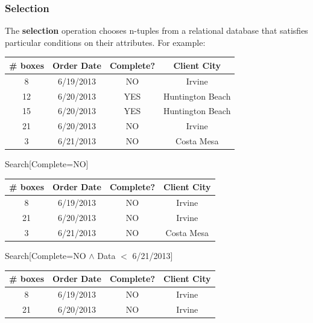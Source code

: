 \subsubsection*{Selection}
The \textbf{selection} operation chooses n-tuples from a relational database that satisfies particular conditions on their attributes.
For example:
\begin{center}
  \begin{tabular}{cccc}
    \# boxes & Order Date & Complete? & Client City      \\
    \hline
    8        & 6/19/2013  & NO        & Irvine           \\
    12       & 6/20/2013  & YES       & Huntington Beach \\
    15       & 6/20/2013  & YES       & Huntington Beach \\
    21       & 6/20/2013  & NO        & Irvine           \\
    3        & 6/21/2013  & NO        & Costa Mesa
  \end{tabular}
\end{center}
Search[Complete=NO]
\begin{center}
  \begin{tabular}{cccc}
    \# boxes & Order Date & Complete? & Client City \\
    \hline
    8        & 6/19/2013  & NO        & Irvine      \\
    21       & 6/20/2013  & NO        & Irvine      \\
    3        & 6/21/2013  & NO        & Costa Mesa
  \end{tabular}
\end{center}
Search[Complete=NO $\land$ Data $<$ 6/21/2013]
\begin{center}
  \begin{tabular}{cccc}
    \# boxes & Order Date & Complete? & Client City \\
    \hline
    8        & 6/19/2013  & NO        & Irvine      \\
    21       & 6/20/2013  & NO        & Irvine
  \end{tabular}
\end{center}

